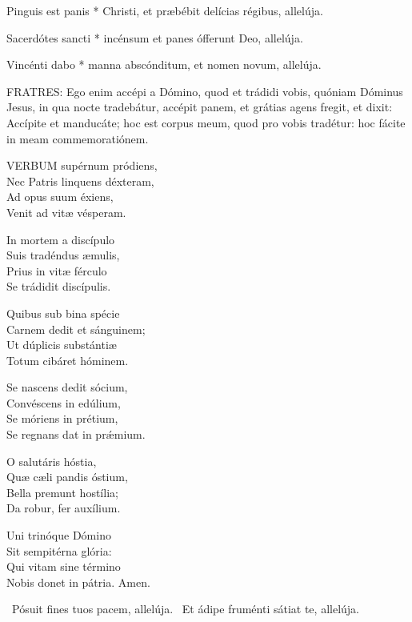  Pinguis est panis * Christi, et præbébit delícias régibus, allelúja.

 Sacerdótes sancti * incénsum et panes ófferunt Deo, allelúja.

 Vincénti dabo * manna abscónditum, et nomen novum, allelúja.


\lettrine[lines=2]{F}{RATRES}: Ego enim accépi a Dómino, quod et trádidi vobis, quóniam Dóminus Jesus, in qua nocte tradebátur, accépit panem, et grátias agens fregit, et dixit: Accípite et manducáte; hoc est corpus meum, quod pro vobis tradétur: hoc fácite in meam commemoratiónem.


\lettrine[lines=2]{V}{ERBUM} supérnum pródiens,\\
Nec Patris linquens déxteram,\\
Ad opus suum éxiens,\\
Venit ad vitæ vésperam.

In mortem a discípulo\\
Suis tradéndus æmulis,\\
Prius in vitæ férculo\\
Se trádidit discípulis.

Quibus sub bina spécie\\
Carnem dedit et sánguinem;\\
Ut dúplicis substántiæ\\
Totum cibáret hóminem.

Se nascens dedit sócium,\\
Convéscens in edúlium,\\
Se móriens in prétium,\\
Se regnans dat in prǽmium.

O salutáris hóstia,\\
Quæ cæli pandis óstium,\\
Bella premunt hostília;\\
Da robur, fer auxílium.


Uni trinóque Dómino\\
Sit sempitérna glória:\\
Qui vitam sine término\\
Nobis donet in pátria. Amen.

\V\ Pósuit fines tuos pacem, allelúja. \R\ Et ádipe fruménti sátiat te, allelúja.

